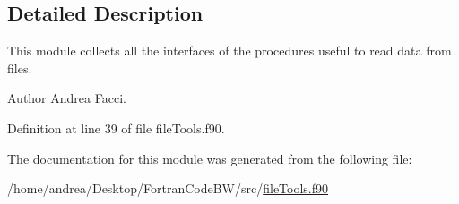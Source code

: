 \subsection{Detailed Description}
This module collects all the interfaces of the procedures useful to read data from files. \begin{DoxyAuthor}{Author}
Andrea Facci. 
\end{DoxyAuthor}


Definition at line 39 of file file\-Tools.\-f90.



The documentation for this module was generated from the following file\-:\begin{DoxyCompactItemize}
\item 
/home/andrea/\-Desktop/\-Fortran\-Code\-B\-W/src/\hyperlink{file_tools_8f90}{file\-Tools.\-f90}\end{DoxyCompactItemize}
